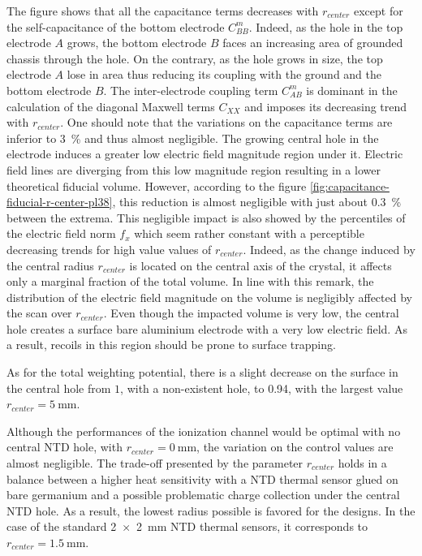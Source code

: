 The figure shows that all the capacitance terms decreases with $r_{center}$ except for the self-capacitance of the bottom electrode $C_{BB}^m$. Indeed, as the hole in the top electrode $A$ grows, the bottom electrode $B$ faces an increasing area of grounded chassis through the hole. On the contrary, as the hole grows in size, the top electrode $A$ lose in area thus reducing its coupling with the ground and the bottom electrode $B$. The inter-electrode coupling term $C_{AB}^m$ is dominant in the calculation of the diagonal Maxwell terms $C_{XX}$ and imposes its decreasing trend with $r_{center}$. One should note that the variations on the capacitance terms are inferior to \SI{3}{\percent} and thus almost negligible.
The growing central hole in the electrode induces a greater low electric field magnitude region under it. Electric field lines are diverging from this low magnitude region resulting in a lower theoretical fiducial volume. However, according to the figure \ref{fig:capacitance-fiducial-r-center-pl38}, this reduction is almost negligible with just about \SI{0.3}{\percent} between the extrema.
This negligible impact is also showed by the percentiles of the electric field norm $f_x$ which seem rather constant with a perceptible decreasing trends for high value values of $r_{center}$. Indeed, as the change induced by the central radius $r_{center}$ is located on the central axis of the crystal, it affects only a marginal fraction of the total volume. In line with this remark, the distribution of the electric field magnitude on the volume is negligibly affected by the scan over $r_{center}$. Even though the impacted volume is very low, the central hole creates a surface bare aluminium electrode with a very low electric field. As a result, recoils in this region should be prone to surface trapping. 

As for the total weighting potential, there is a slight decrease on the surface in the central hole from $1$, with a non-existent hole, to \num{0.94}, with the largest value $r_{center}=\SI{5}{\mm}$.

Although the performances of the ionization channel would be optimal with no central NTD hole, with $r_{center}=\SI{0}{\mm}$, the variation on the control values are almost negligible. The trade-off presented by the parameter $r_{center}$ holds in a balance between a higher heat sensitivity with a NTD thermal sensor glued on bare germanium and a possible problematic charge collection under the central NTD hole. As a result, the lowest radius possible is favored for the designs. In the case of the standard \SI{2 x 2}{\mm} NTD thermal sensors, it corresponds to $r_{center}=\SI{1.5}{\mm}$.

